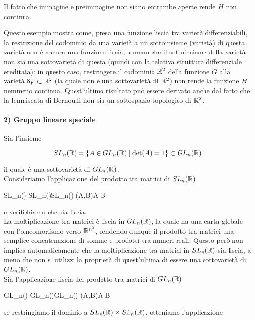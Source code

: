 Il fatto che immagine e preimmagine non siano entrambe aperte rende $ H $ non continua.


Questo esempio mostra come, presa una funzione liscia tra varietà differenziabili, la restrizione del codominio da una varietà a un sottoinsieme (varietà) di questa varietà non è ancora una funzione liscia, a meno che il sottoinsieme della varietà non sia una sottovarietà di questa (quindi con la relativa struttura differenziale ereditata): in questo caso, restringere il codominio $ \mathbb{R}^{2} $ della funzione $ G $ alla varietà $ \mathfrak{8}_{F} \subset \mathbb{R}^{2} $ (la quale non è una sottovarietà di $ \mathbb{R}^{2} $) non rende la funzione $ H $ nemmeno continua. Quest'ultimo risultato può essere derivato anche dal fatto che la lemniscata di Bernoulli non sia un sottospazio topologico di $ \mathbb{R}^{2} $.

\paragraph{2) Gruppo lineare speciale}\label{ex-slnr}

Sia l'insieme

\begin{equation}
	SL_{n}(\mathbb{R}) = \{ A \in GL_{n}(\mathbb{R}) \mid \det(A) = 1 \} \subset GL_{n}(\mathbb{R})
\end{equation}

il quale è una sottovarietà di $ GL_{n}(\mathbb{R}) $.\\
Consideriamo l'applicazione del prodotto tra matrici di $ SL_{n}(\mathbb{R}) $

\map{\mu}
	{SL_{n}(\R) \times SL_{n}(\R)}{SL_{n}(\R)}
	{(A,B)}{A B}

e verifichiamo che sia liscia.\\
La moltiplicazione tra matrici è liscia in $ GL_{n}(\mathbb{R}) $, la quale ha una carta globale con l'omeomorfismo verso $ \mathbb{R}^{n^{2}} $, rendendo dunque il prodotto tra matrici una semplice concatenazione di somme e prodotti tra numeri reali. Questo però non implica automaticamente che la moltiplicazione tra matrici in $ SL_{n}(\mathbb{R}) $ sia liscia, a meno che non si utilizzi la proprietà di quest'ultima di essere una sottovarietà di $ GL_{n}(\mathbb{R}) $.\\
Sia l'applicazione liscia del prodotto tra matrici di $ GL_{n}(\mathbb{R}) $

	{GL_{n}(\R) \times GL_{n}(\R)}{GL_{n}(\R)}
	{(A,B)}{A B}

se restringiamo il dominio a $ SL_{n}(\mathbb{R}) \times SL_{n}(\mathbb{R}) $, otteniamo l'applicazione

